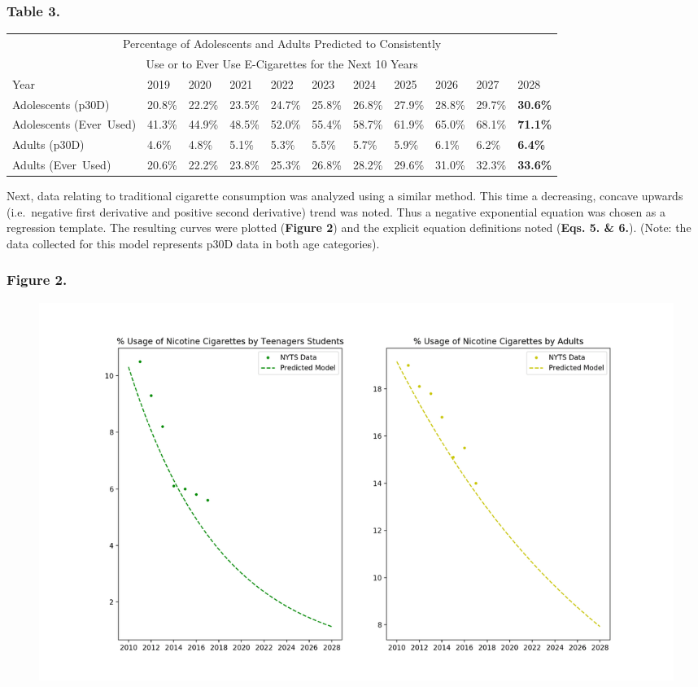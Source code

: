 \subsubsection*{Table 3.}
\begin{center}
    \begin{tabular}{p{1in} p{0.4in} p{0.4in} p{0.4in} p{0.4in} p{0.4in} p{0.4in} p{0.4in} p{0.4in} p{0.4in} p{0.4in}}
        \toprule
        \multicolumn{11}{c}{Percentage of Adolescents and Adults Predicted to Consistently}\\
        \multicolumn{11}{c}{Use or to Ever Use E-Cigarettes for the Next 10 Years}\\    
        \midrule
        Year & 2019 & 2020 & 2021 & 2022 & 2023 & 2024 & 2025 & 2026 & 2027 & 2028 \\
        \midrule
        Adolescents (p30D) & 20.8\% & 22.2\% & 23.5\% & 24.7\% & 25.8\% & 26.8\% & 27.9\% & 28.8\% & 29.7\% & \textbf{30.6\%} \\
        Adolescents (Ever~Used) & 41.3\% & 44.9\% & 48.5\% & 52.0\% & 55.4\% & 58.7\% & 61.9\% & 65.0\% & 68.1\% & \textbf{71.1\%} \\
        Adults (p30D) & 4.6\% & 4.8\% & 5.1\% & 5.3\% & 5.5\% & 5.7\% & 5.9\% & 6.1\% & 6.2\% & \textbf{6.4\%} \\
        Adults (Ever~Used) & 20.6\% & 22.2\% & 23.8\% & 25.3\% & 26.8\% & 28.2\% & 29.6\% & 31.0\% & 32.3\% & \textbf{33.6\%} \\
        \bottomrule
    \end{tabular}
\end{center}

Next, data relating to traditional cigarette consumption was analyzed using a similar method. This time a decreasing, concave upwards (i.e.\ negative first derivative and positive second derivative) trend was noted. Thus a negative exponential equation was chosen as a regression template. The resulting curves were plotted (\textbf{Figure 2}) and the explicit equation definitions noted (\textbf{Eqs. 5. \& 6.}). (Note: the data collected for this model represents p30D data in both age categories).

\subsubsection*{Figure 2.}
\begin{figure}[H]
    \centering \includegraphics*[scale=.25]{assets/math-modeling-figure-2.png}
\end{figure}

